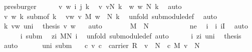 \begin{isabellebody}
\ presburger\isanewline
\ \ \ \ \isamarkupfalse%
\ v\ w\ i\ j\ k\ \isamarkupfalse%
\ v{}{\isacharcolon}\ {\isachardoublequoteopen}v{\isasymin}N\ k{\isachardoublequoteclose}\ \ w{}{\isacharcolon}\ {\isachardoublequoteopen}w{\isasymin}\ N\ k{\isachardoublequoteclose}\ \isamarkupfalse%
\ auto\isanewline
\ \ \ \ \isamarkupfalse%
\ v{}\ w{}\ k\ subm{\isacharbrackleft}of\ k{\isacharbrackright}\ \isamarkupfalse%
\ vw{\isacharcolon}\ {\isachardoublequoteopen}v\ {\isasymoplus}\isactrlbsub M\isactrlesub \ w\ {\isasymin}\ N\ k{\isachardoublequoteclose}\ \isamarkupfalse%
\ {\isacharparenleft}unfold\ submodule{\isacharunderscore}def{\isacharparenright}\ \isamarkupfalse%
\ auto\isanewline
\ \ \ \ \isamarkupfalse%
\ k\ vw\ uni\ \isamarkupfalse%
\ {\isachardoublequoteopen}{\isacharquery}thesis\ v\ w{\isachardoublequoteclose}\ \ \isamarkupfalse%
\ auto\isanewline
\ \ \isamarkupfalse%
\isanewline
\ \ \isamarkupfalse%
\ {}{\isacharcolon}\ {\isachardoublequoteopen}{\isasymzero}\isactrlbsub M\isactrlesub \ {\isasymin}\ N{\isacharprime}{\isachardoublequoteclose}\isanewline
\ \ \isamarkupfalse%
\ {\isacharminus}\ \isanewline
\ \ \ \ \isamarkupfalse%
\ ne\ \isamarkupfalse%
\ i\ \ i{\isacharcolon}\ {\isachardoublequoteopen}i{\isasymin}I{\isachardoublequoteclose}\ \isamarkupfalse%
\ auto\isanewline
\ \ \ \ \isamarkupfalse%
\ i\ subm\ \isamarkupfalse%
\ zi{\isacharcolon}\ {\isachardoublequoteopen}{\isasymzero}\isactrlbsub M\isactrlesub {\isasymin}N\ i{\isachardoublequoteclose}\ \isamarkupfalse%
\ {\isacharparenleft}unfold\ submodule{\isacharunderscore}def{\isacharcomma}\ auto{\isacharparenright}\isanewline
\ \ \ \ \isamarkupfalse%
\ i\ zi\ uni\ \isamarkupfalse%
\ {\isacharquery}thesis\ \isamarkupfalse%
\ auto\isanewline
\ \ \isamarkupfalse%
\isanewline
\ \ \isamarkupfalse%
\ uni\ subm\ \isamarkupfalse%
\ {}{\isacharcolon}\ {\isachardoublequoteopen}{\isasymAnd}c\ v{\isachardot}\ c\ {\isasymin}\ carrier\ R\ {\isasymLongrightarrow}\ v\ {\isasymin}\ N{\isacharprime}\ {\isasymLongrightarrow}\ c\ {\isasymodot}\isactrlbsub M\isactrlesub \ v\ {\isasymin}\ N{\isacharprime}{\isachardoublequoteclose}\isanewline

\end{isabellebody}
